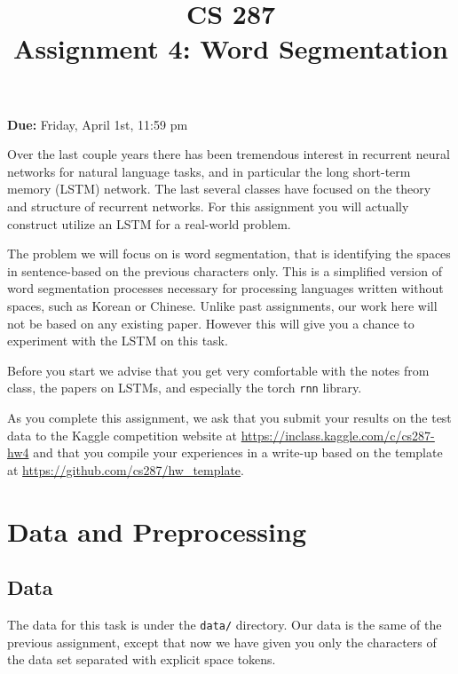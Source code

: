\documentclass[11pt]{article}
\title{CS 287 \\ Assignment 4: Word Segmentation}
\date{}
\begin{document}
\maketitle{}

\begin{center}
  \textbf{Due:} Friday, April 1st, 11:59 pm 
\end{center}


Over the last couple years there has been tremendous interest in
recurrent neural networks for natural language tasks, and in
particular the long short-term memory (LSTM) network. The last 
several classes have focused on the theory and structure of 
recurrent networks. For this assignment you will actually 
construct utilize an LSTM for a real-world problem. 

The problem we will focus on is word segmentation, that is identifying
the spaces in sentence-based on the previous characters only.  This is
a simplified version of word segmentation processes necessary for
processing languages written without spaces, such as Korean or Chinese.
Unlike past assignments, our work here will not be based on any
existing paper. However this will give you a chance 
to experiment with the LSTM on this task. 

Before you start we advise that you get very comfortable with the
notes from class, the papers on LSTMs, and especially the torch
\texttt{rnn} library.

As you complete this assignment, we ask that you submit your results
on the test data to the Kaggle competition website at
\url{https://inclass.kaggle.com/c/cs287-hw4} and that you compile your
experiences in a write-up based on the template at
\url{https://github.com/cs287/hw_template}.

\section{Data and Preprocessing}

\subsection{Data}

The data for this task is under the \texttt{data/} directory. 
Our data is the same of the previous assignment, except that 
now we have given you only the characters of the data set 
separated with explicit space tokens. 


\lstset{ basicstyle=\ttfamily, breaklines=true}
\end{document}
